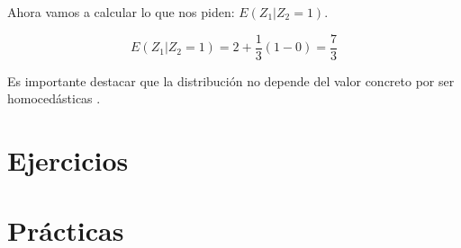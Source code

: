 \documentclass[nochap]{apuntes}
\begin{document}
\begin{example}
Ahora vamos a calcular lo que nos piden: $E(Z_1|Z_2=1)$.

\[E(Z_1|Z_2=1) = 2 + \frac{1}{3}(1-0) = \frac{7}{3}\]

Es importante destacar que la distribución no depende del valor concreto por ser homocedásticas .

\end{example}

\appendix
\chapter{Ejercicios}


\chapter{Prácticas}

\end{document}
